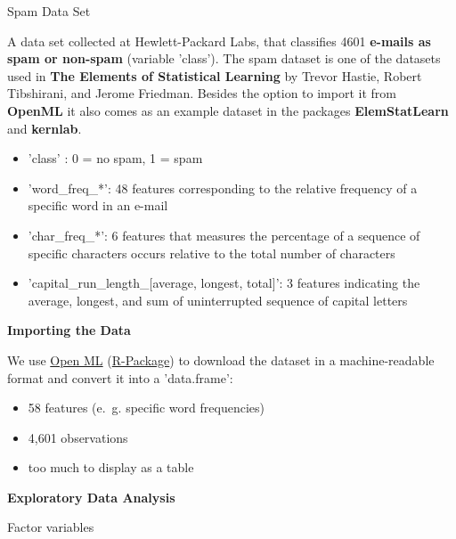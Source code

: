 \documentclass[11pt,compress,t,notes=noshow, xcolor=table]{beamer}
\begin{document}
\begin{vbframe}{Spam Data Set}




A data set collected at Hewlett-Packard Labs, that classifies 4601 \textbf{e-mails as spam or non-spam} (variable 'class').
The spam dataset is one of the datasets used in \textbf{The Elements of Statistical Learning} by Trevor Hastie, Robert Tibshirani, and Jerome Friedman.
Besides the option to import it from \textbf{OpenML} it also comes as an example dataset in the packages \textbf{ElemStatLearn} and \textbf{kernlab}.

\framebreak

\begin{itemize}

  \item 'class'      : 0 = no spam, 1 = spam
  \item 'word\_freq\_*': 48 features corresponding to the relative frequency of a specific word in an e-mail
  \item 'char\_freq\_*': 6 features that measures the percentage of a sequence of specific characters occurs relative to the total number of characters
  \item 'capital\_run\_length\_[average, longest, total]': 3 features indicating the average, longest, and sum of uninterrupted sequence of capital letters

\end{itemize}

\framebreak

\textbf{Importing the Data}

We use \href{https://www.openml.org}{Open ML} (\href{https://cran.r-project.org/package=OpenML}{R-Package}) to download the dataset in a machine-readable format and convert it into a 'data.frame':





\begin{itemize}
\item 58 features (e.~g. specific word frequencies)
\item 4,601 observations
\item too much to display as a table

\end{itemize}


\framebreak

\textbf{Exploratory Data Analysis}

Factor variables

\begin{table}[H]
\centering\begingroup\fontsize{7}{9}\selectfont


\end{table}
\end{vbframe}
\end{document}
